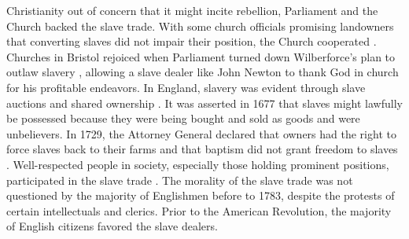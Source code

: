 Christianity out of concern that it might incite rebellion, Parliament and the Church backed the slave trade. With some church officials promising landowners that converting slaves did not impair their position, the Church cooperated . Churches in Bristol rejoiced when Parliament turned down Wilberforce's plan to outlaw slavery , allowing a slave dealer like John Newton to thank God in church for his profitable endeavors. In England, slavery was evident through slave auctions and shared ownership . It was asserted in 1677 that slaves might lawfully be possessed because they were being bought and sold as goods and were unbelievers. In 1729, the Attorney General declared that owners had the right to force slaves back to their farms and that baptism did not grant freedom to slaves . Well-respected people in society, especially those holding prominent positions, participated in the slave trade . The morality of the slave trade was not questioned by the majority of Englishmen before to 1783, despite the protests of certain intellectuals and clerics. Prior to the American Revolution, the majority of English citizens favored the slave dealers.